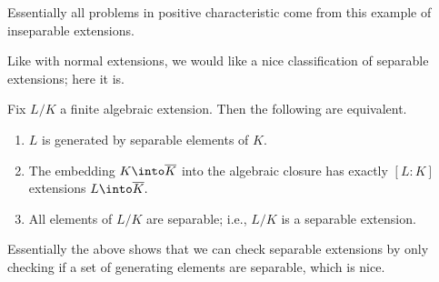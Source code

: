 \documentclass[../notes.tex]{subfiles}
\begin{document}
\begin{remark}
	Essentially all problems in positive characteristic come from this example of inseparable extensions.
\end{remark}
Like with normal extensions, we would like a nice classification of separable extensions; here it is.
\begin{proposition} \label{prop:sepgrabbag}
	Fix $L/K$ a finite algebraic extension. Then the following are equivalent.
	\begin{enumerate}[label=(\alph*)]
		\item $L$ is generated by separable elements of $K.$
		\item The embedding $K\into\overline K$ into the algebraic closure has exactly $[L:K]$ extensions $L\into\overline K.$
		\item All elements of $L/K$ are separable; i.e., $L/K$ is a separable extension.
	\end{enumerate}
\end{proposition}
Essentially the above shows that we can check separable extensions by only checking if a set of generating elements are separable, which is nice.
\end{document}
